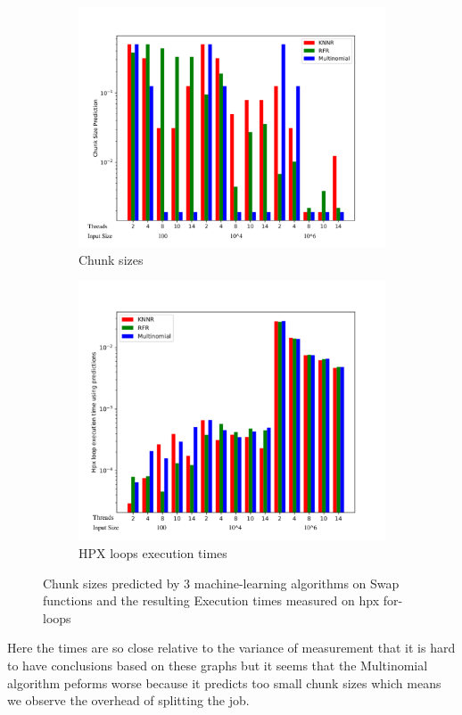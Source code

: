 \begin{figure}[h]
	\centering
	\begin{subfigure}[b]{0.5\textwidth}
		\centering
		\includegraphics[width=\textwidth]{images/bars_Swap_cs.pdf}
		\caption[Network2]%
		{{Chunk sizes}}    
	\end{subfigure}
	\hfill
	\begin{subfigure}[b]{0.49\textwidth}  
		\centering 
		\includegraphics[width=\textwidth]{images/bars_Swap_times.pdf}
		\caption[]%
		{{HPX loops execution times}}    
	\end{subfigure}
	\caption{Chunk sizes predicted by 3 machine-learning algorithms on Swap functions and the resulting Execution times measured on hpx for-loops} 
\end{figure}
Here the times are so close relative to the variance of measurement that it is hard to have conclusions based on these graphs but it seems that the Multinomial algorithm peforms worse because it predicts too small chunk sizes which means we observe the overhead of splitting the job.
\newpage
